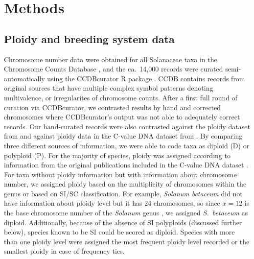 \section{Methods}

\subsection{Ploidy and breeding system data}


Chromosome number data were obtained for all Solanaceae taxa in the Chromosome Counts Database \citep[CCDB;][]{rice_2015}, and the ca.~14,000 records were curated semi-automatically using the CCDBcurator R package \citep{rivero_2019}.
CCDB contains records from original sources that have multiple complex symbol patterns denoting multivalence, or irregularites of chromosome counts.
After a first full round of curation via CCDBcurator, we contrasted results by hand and corrected chromosomes where CCDBcurator's output was not able to adequately correct records.
Our hand-curated records were also contrasted against the ploidy dataset from \citet{robertson_2011} and against ploidy data in the C-value DNA dataset from \citet{bennett_2005}.
By comparing three different sources of information, we were able to code taxa as diploid (D) or polyploid (P).
For the majority of species, ploidy was assigned according to information from the original publications included in the  C-value DNA dataset \citep{bennett_2005}.
For taxa without ploidy information but with information about chromosome number, we assigned ploidy based on the multiplicity of chromosomes within the genus or based on SI/SC classification.
For example, \textit{Solanum betaceum} did not have information about ploidy level but it has 24 chromosomes, so since $x=12$ is the base chromosome number of the \textit{Solanum} genus \citep{olmstead_2007}, we assigned \textit{S.~betaceum} as diploid. 
Additionally, because of the absence of SI polyploids (discussed further below), species known to be SI could be scored as diploid.
Species with more than one ploidy level were assigned the most frequent ploidy level recorded or the smallest ploidy in case of frequency ties.

